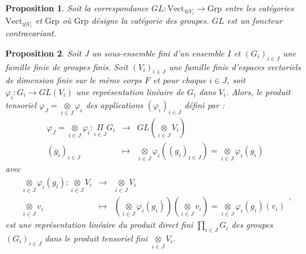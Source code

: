 \documentclass[9pt]{beamer}
\newtheorem{proposition}{Proposition}
\begin{document}
\begin{frame}
\begin{proposition}
Soit la correspondance \( GL : \text{Vect}_{\otimes V_i} \rightarrow \text{Grp} \) entre les catégories 
	\( \text{Vect}_{\otimes V_i} \) et \( \text{Grp} \) où \( \text{Grp} \) désigne la catégorie des groupes. \( GL \) est un foncteur contravariant.
	
\end{proposition}

	\begin{proposition}
Soit $J$ un sous-ensemble fini d'un ensemble $I$ et $(G_i)_{i\in J}$ une famille finie de groupes finis. Soit $(V_i)_{i\in J}$ une famille finie d'espaces vectoriels de dimension finie sur le même corps $F$ et pour chaque $i \in J$, soit $\varphi_i: G_i\rightarrow GL(V_i)$ une représentation linéaire de $G_i$ dans $V_i$. Alors, le produit tensoriel $\varphi_{J}= \underset{i\in J}\otimes \varphi_i$ des applications $(\varphi_i)_{i\in J}$ défini par : 
	$$\begin{array}{llll}
		\varphi_{J}= \underset{i\in J}\otimes \varphi_i: \underset{i\in J}\Pi G_i&\longrightarrow& GL(\underset{i\in J}\otimes V_i)\\ 
		(g_i)_{i\in J}&\longmapsto& \underset{i\in J}\otimes \varphi_i ((g_i)_{i\in J})= \underset{i\in J}\otimes \varphi_i(g_i)                                                                                                                                                                                                         
	\end{array}
	$$ 
	avec
	$$\begin{array}{rlll} 
		\underset{i\in J}\otimes \varphi_i(g_i): \underset{i\in J}\otimes V_i&\longrightarrow& \underset{i\in J}\otimes V_i\\
		\underset{i\in J}\otimes v_i&\longmapsto&(\underset{i\in J}\otimes \varphi_i(g_i))(\underset{i\in J}\otimes v_i)=\underset{i\in J}\otimes \varphi_i(g_i)(v_i)
	\end{array} 
	,$$ est une représentation linéaire du produit direct fini $\underset{i\in J}\prod G_i$ des groupes $(G_i)_{i\in J}$ dans le produit tensoriel fini $\underset{i\in J}\otimes V_i$.
\end{proposition}

\end{frame}
\end{document}
